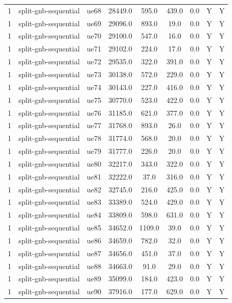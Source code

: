 \begin{table}[ht]
\begin{tabular}{|c|c|c|c|c|c|c|c|c|}
1 & split-gnb-sequential & ue68 & 28449.0 & 595.0 & 439.0 & 0.0 & Y & Y \\
1 & split-gnb-sequential & ue69 & 29096.0 & 893.0 & 19.0 & 0.0 & Y & Y \\
1 & split-gnb-sequential & ue70 & 29100.0 & 547.0 & 16.0 & 0.0 & Y & Y \\
1 & split-gnb-sequential & ue71 & 29102.0 & 224.0 & 17.0 & 0.0 & Y & Y \\
1 & split-gnb-sequential & ue72 & 29535.0 & 322.0 & 391.0 & 0.0 & Y & Y \\
1 & split-gnb-sequential & ue73 & 30138.0 & 572.0 & 229.0 & 0.0 & Y & Y \\
1 & split-gnb-sequential & ue74 & 30143.0 & 227.0 & 416.0 & 0.0 & Y & Y \\
1 & split-gnb-sequential & ue75 & 30770.0 & 523.0 & 422.0 & 0.0 & Y & Y \\
1 & split-gnb-sequential & ue76 & 31185.0 & 621.0 & 377.0 & 0.0 & Y & Y \\
1 & split-gnb-sequential & ue77 & 31768.0 & 893.0 & 26.0 & 0.0 & Y & Y \\
1 & split-gnb-sequential & ue78 & 31774.0 & 568.0 & 20.0 & 0.0 & Y & Y \\
1 & split-gnb-sequential & ue79 & 31777.0 & 226.0 & 20.0 & 0.0 & Y & Y \\
1 & split-gnb-sequential & ue80 & 32217.0 & 343.0 & 322.0 & 0.0 & Y & Y \\
1 & split-gnb-sequential & ue81 & 32222.0 & 37.0 & 316.0 & 0.0 & Y & Y \\
1 & split-gnb-sequential & ue82 & 32745.0 & 216.0 & 425.0 & 0.0 & Y & Y \\
1 & split-gnb-sequential & ue83 & 33389.0 & 524.0 & 429.0 & 0.0 & Y & Y \\
1 & split-gnb-sequential & ue84 & 33809.0 & 598.0 & 631.0 & 0.0 & Y & Y \\
1 & split-gnb-sequential & ue85 & 34652.0 & 1109.0 & 39.0 & 0.0 & Y & Y \\
1 & split-gnb-sequential & ue86 & 34659.0 & 782.0 & 32.0 & 0.0 & Y & Y \\
1 & split-gnb-sequential & ue87 & 34656.0 & 451.0 & 37.0 & 0.0 & Y & Y \\
1 & split-gnb-sequential & ue88 & 34663.0 & 91.0 & 29.0 & 0.0 & Y & Y \\
1 & split-gnb-sequential & ue89 & 35099.0 & 184.0 & 423.0 & 0.0 & Y & Y \\
1 & split-gnb-sequential & ue90 & 37916.0 & 177.0 & 629.0 & 0.0 & Y & Y \\

\end{tabular}
\end{table}
